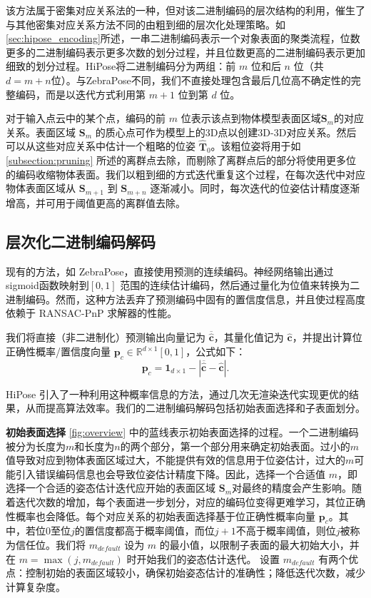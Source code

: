 该方法属于密集对应关系法的一种，但对该二进制编码的层次结构的利用，催生了与其他密集对应关系方法不同的由粗到细的层次化处理策略。如\autoref{sec:hipose_encoding}所述，一串二进制编码表示一个对象表面的聚类流程，位数更多的二进制编码表示更多次数的划分过程，并且位数更高的二进制编码表示更加细致的划分过程。HiPose将二进制编码分为两组：前 $m$ 位和后 $n$ 位（共$d=m+n$位）。与ZebraPose\cite{su2022zebrapose}不同，我们不直接处理包含最后几位高不确定性的完整编码，而是以迭代方式利用第 ${m+1}$ 位到第 $d$ 位。

对于输入点云中的某个点，编码的前 $m$ 位表示该点到物体模型表面区域$\mathbf{S}_{m}$的对应关系。表面区域 $\mathbf{S}_{m}$ 的质心点可作为模型上的3D点以创建3D-3D对应关系。然后可以从这些对应关系中估计一个粗略的位姿 $\hat{\mathbf{T}}_{0}$。该粗位姿将用于如\autoref{subsection:pruning} 所述的离群点去除，而剔除了离群点后的部分将使用更多位的编码收缩物体表面。我们以粗到细的方式迭代重复这个过程，在每次迭代中对应物体表面区域从 $\mathbf{S}_{m+1}$ 到 $\mathbf{S}_{m+n}$ 逐渐减小。同时，每次迭代的位姿估计精度逐渐增高，并可用于阈值更高的离群值去除。

\subsection{层次化二进制编码解码}
\label{subsection:solver}
现有的方法，如 ZebraPose\cite{su2022zebrapose}，直接使用预测的连续编码。神经网络输出通过sigmoid函数映射到$[0,1]$ 范围的连续估计编码，然后通过量化为位值来转换为二进制编码。然而，这种方法丢弃了预测编码中固有的置信度信息，并且使过程高度依赖于 RANSAC-PnP 求解器的性能。

我们将直接（非二进制化）预测输出向量记为 $\overline{\hat{\mathbf{c}}}$，其量化值记为 $\hat{\mathbf{c}}$，并提出计算位正确性概率/置信度向量 $\mathbf{p}_{c} \in \mathbb{R}^{d\times1}{[0,1]}$，公式如下： 
\begin{equation}
    \mathbf{p}_{c} = \mathbf{1}_{d\times1} - |\overline{\hat{\mathbf{c}}} - \hat{\mathbf{c}}|. 
\end{equation} 

HiPose 引入了一种利用这种概率信息的方法，通过几次无渲染迭代实现更优的结果，从而提高算法效率。我们的二进制编码解码包括初始表面选择和子表面划分。

\textbf{初始表面选择} \autoref{fig:overview} 中的蓝线表示初始表面选择的过程。一个二进制编码被分为长度为$m$和长度为$n$的两个部分，第一个部分用来确定初始表面。过小的$m$值导致对应到物体表面区域过大，不能提供有效的信息用于位姿估计，过大的$m$可能引入错误编码信息也会导致位姿估计精度下降。因此，选择一个合适值 $m$，即选择一个合适的姿态估计迭代应开始的表面区域 $\mathbf{S}_{m}$对最终的精度会产生影响。随着迭代次数的增加，每个表面进一步划分，对应的编码位变得更难学习，其位正确性概率也会降低。每个对应关系的初始表面选择基于位正确性概率向量 $\mathbf{p}_{c}$。其中，若位$0$至位$j$的置信度都高于概率阈值，而位$j+1$不高于概率阈值，则位$j$被称为信任位。我们将 $m_{default}$ 设为 $m$ 的最小值，以限制子表面的最大初始大小，并在 $m = \max(j, m_{default})$ 时开始我们的姿态估计迭代。
设置 $m_{default}$ 有两个优点：控制初始的表面区域较小，确保初始姿态估计的准确性；降低迭代次数，减少计算复杂度。

